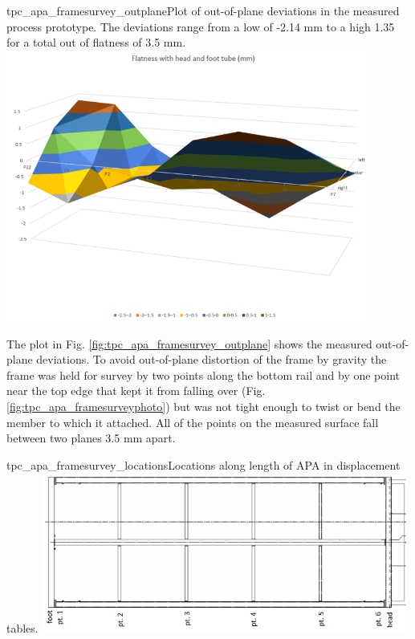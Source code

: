 \begin{cdrfigure}{tpc_apa_framesurvey_outplane}{Plot of out-of-plane deviations in the measured process prototype.  The deviations range from a low of -2.14 mm to a high 1.35 for a total out of flatness of 3.5 mm.}
\includegraphics[width=0.9\textwidth]{figures/tpc_apa_framesurvey_outplane.png} 
\end{cdrfigure}

The plot in Fig. \ref{fig:tpc_apa_framesurvey_outplane} shows the measured out-of-plane deviations.  To avoid out-of-plane distortion of the frame by gravity the frame was held for survey by two points along the bottom rail and by one point near the top edge that kept it from falling over (Fig. \ref{fig:tpc_apa_framesurveyphoto}) but was not tight enough to twist or bend the member to which it attached.  All of the points on the measured surface fall between two planes 3.5 mm apart.

\begin{cdrfigure}{tpc_apa_framesurvey_locations}{Locations along length of APA in displacement tables.}
\includegraphics[width=0.9\textwidth]{figures/tpc_apa_framesurvey_locations.png} 
\end{cdrfigure}

